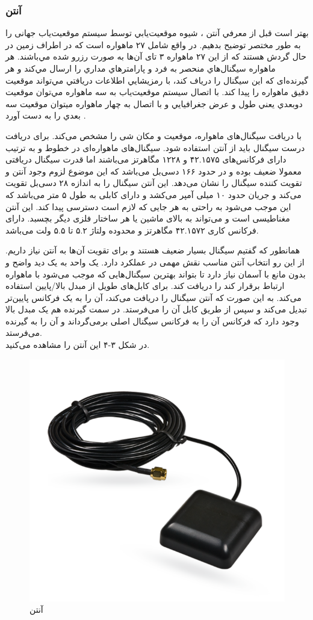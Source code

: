 \subsubsection{آنتن }
بهتر است قبل از معرفي آنتن ، شيوه موقعيت‌يابي توسط سيستم موقعیت‌یاب جهانی را به طور مختصر توضيح بدهيم.  در واقع شامل ۲۷ ماهواره است كه در اطراف زمين در حال گردش هستند كه از اين ۲۷ ماهواره ۳ تای آن‌ها به صورت رزرو شده مي‌باشند. هر ماهواره سيگنال‌هاي منحصر به فرد و پارامترهاي مداري را ارسال مي‌كند و هر گیرنده‌ای كه اين سيگنال را درياف كند، با رمزيشايي اطلاعات دريافتي مي‌تواند موقعيت دقيق ماهواره را پيدا كند. با اتصال سيستم موقعيت‌ياب به سه ماهواره مي‌توان موقعيت دوبعدي يعني طول و عرض جغرافيايي و با اتصال به چهار ماهواره ميتوان موقعيت سه بعدي را به دست آورد \cite{Agrawal2018}.


 با دریافت سیگنال‌های ماهواره، موقعیت و مکان شی را مشخص می‌کند. برای دریافت درست سیگنال باید از آنتن استفاده شود. سیگنال‌های ماهواره‌ای  در خطوط  و  به ترتیب دارای فرکانس‌های ۴۲.۱۵۷۵ و ۱۲۲۸ مگاهرتز می‌باشند اما قدرت سیگنال دریافتی معمولا ضعیف بوده و در حدود ۱۶۶ دسی‌بل می‌باشد که این موضوع لزوم وجود آنتن و تقویت کننده سیگنال  را نشان می‌دهد. این آنتن سیگنال را به اندازه ۲۸ دسی‌بل تقویت می‌کند و جریان حدود ۱۰ میلی آمپر می‌کشد و دارای کابلی به طول ۵ متر می‌باشد که این موجب می‌شود به راحتی به هر جایی که لازم است دسترسی پیدا کند. این آنتن مغناطیسی است و می‌تواند به بالای ماشین یا هر ساختار فلزی دیگر بچسبد. دارای فرکانس کاری ۴۲.۱۵۷۲ مگاهرتز و محدوده ولتاژ ۵.۲ تا ۵.۵ ولت می‌باشد.


همانطور که گفتیم سیگنال  بسیار ضعیف هستند و برای تقویت آن‌ها به آنتن نیاز داریم. از این رو انتخاب آنتن مناسب نقش مهمی در عملکرد  دارد. یک واحد  به یک دید واضح و بدون مانع با آسمان نیاز دارد تا بتواند بهترین سیگنال‌هایی که موجب می‌شود با ماهواره ارتباط برقرار کند را دریافت کند.  برای کابل‌های طویل از مبدل بالا/پایین استفاده می‌کند. به این صورت که آنتن سیگنال  را دریافت می‌کند، آن را به یک فرکانس پایین‌تر تبدیل می‌کند و سپس از طریق کابل  آن را می‌فرستد. در سمت گیرنده  هم یک مبدل بالا وجود دارد که فرکانس آن را به فرکانس سیگنال اصلی برمی‌گرداند و آن را به گیرنده  می‌فرستد.\\
در شکل ۳-۴ این آنتن را مشاهده می‌کنید.
\begin{figure}[!h]
	\centerline{\includegraphics[width=.4\textwidth]{gps-antanna}}
	\caption{آنتن }
\end{figure}

